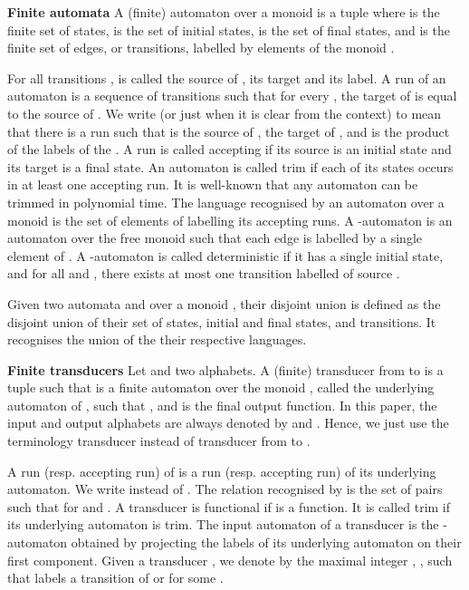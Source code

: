 \documentclass[envcountsame]{llncs}
\begin{document}
\vspace{2mm}
\noindent \textbf{Finite automata} A (finite) automaton
over a monoid  is a tuple  where  is the finite set
of states,  is the set of initial states, 
is the set of final states, and  is the
finite set of edges, or transitions, labelled by elements of the monoid .

For all transitions ,  is called the source of ,  its target and  its label.
A run of an automaton is a sequence of transitions  such that for every , the target of  is equal
to the source of . We write  (or just  when it is clear from the context) to mean
that there is a run  such that  is the source of
,  the target of , and  is the product of the labels
of the . A run is called accepting if its source is an initial state and its target is a final state.
An automaton is called trim if each of its states occurs in at least
one accepting run. It is well-known that any automaton can be trimmed
in polynomial time. The language recognised by an automaton over a monoid  is the set of elements of  labelling its accepting runs.
A -automaton is an automaton over the free monoid  such that each edge is labelled by a single element  of .
A -automaton is called deterministic if it has a single initial state,
and for all  and , there exists at most one
transition labelled  of source .

Given two automata  and  over a monoid , their disjoint
union  is defined as the disjoint union of their set of states, initial and final states,
and transitions. It recognises the union of the their respective
languages. 

\vspace{2mm}
\noindent \textbf{Finite transducers} Let  and  two
alphabets. A (finite)
transducer  from  to  is a tuple
 such that  is a
finite automaton over the monoid , called the underlying automaton of ,
such that , 
and  is the final output
function. In this paper, the input and output alphabets are always denoted by
 and . Hence, we just
use the terminology transducer instead of transducer from 
to . 



A run (resp. accepting run) of  is a run (resp. accepting run)
of its underlying automaton. We write  instead
of . The relation recognised by  is the
set  of pairs  such that  for  and . A transducer  is functional if  is a function. It is called trim if its underlying automaton is trim.
The input automaton of a transducer is the -automaton obtained by projecting the labels of its underlying automaton on their first component.
Given a transducer , we denote by  the
maximal integer , , such that  labels a
transition of  or  for some . 
\end{document}
